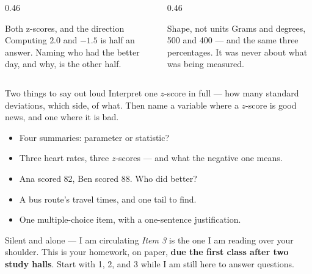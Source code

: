 \documentclass[aspectratio=169, 11pt]{beamer}
\begin{document}
\begin{frame}[t, plain]
  \vspace{6pt}
  \begin{columns}[t]
    \begin{column}{0.46\textwidth}
      \begin{block}{Both z-scores, and the direction}
        Computing $2.0$ and $-1.5$ is half an answer. Naming who had the better day, and why, is
        the other half.
      \end{block}
    \end{column}
    \begin{column}{0.46\textwidth}
      \begin{block}{Shape, not units}
        Grams and degrees, 500 and 400 --- and the same three percentages. It was never about
        what was being measured.
      \end{block}
    \end{column}
  \end{columns}
  \vspace{12pt}
  \begin{block}{Two things to say out loud}
    Interpret one $z$-score in full --- how many standard deviations, which side, of what.
    Then name a variable where a  $z$-score is good news, and one where it
    is bad.
  \end{block}
\end{frame}

\begin{frame}[t, plain]
  \begin{itemize}\setlength{\itemsep}{5pt}
    \item Four summaries: parameter or statistic?
    \item Three heart rates, three $z$-scores --- and what the negative one means.
    \item Ana scored 82, Ben scored 88. Who did better?
    \item A bus route's travel times, and one tail to find.
    \item One multiple-choice item, with a one-sentence justification.
  \end{itemize}
  \begin{block}{Silent and alone --- I am circulating}
    \emph{Item 3} is the one I am reading over your shoulder. This is your 
    homework, on paper, \textbf{due the first class after two study halls}. Start with 1, 2,
    and 3 while I am still here to answer questions.
  \end{block}
\end{frame}
\end{document}
